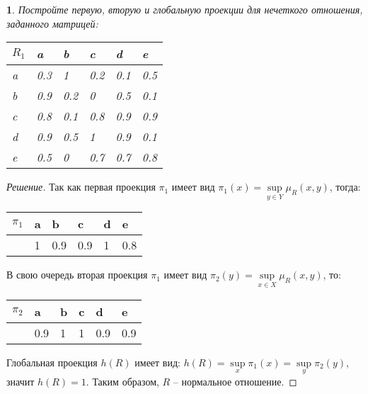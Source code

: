 \documentclass[11pt,a4paper,oneside]{article}
\newenvironment{problem}{
	\medskip
	\begin{problem-internal}
	}{
	\end{problem-internal}
}
\newenvironment{solution}{
	\begin{proof}[Решение]
		\vspace{-8px}
		\setlength{\parskip}{4px}
		\setlength{\parindent}{0px}
	}{
	\end{proof}
}
\newtheorem{problem-internal}{}
\begin{document}
	\newpage
	
	\begin{problem}
		Постройте первую, вторую и глобальную проекции для нечеткого отношения, заданного матрицей: 
		\begin{table}[!htbp]
			\begin{tabular}{|l|l|l|l|l|l|}
				\hline
				$R_1$ & a   & b   & c   & d   & e   \\ \hline
				a     & 0.3 & 1   & 0.2 & 0.1 & 0.5 \\ \hline
				b     & 0.9 & 0.2 & 0   & 0.5 & 0.1 \\ \hline
				c     & 0.8 & 0.1 & 0.8 & 0.9 & 0.9 \\ \hline
				d     & 0.9 & 0.5 & 1   & 0.9 & 0.1 \\ \hline
				e     & 0.5 & 0   & 0.7 & 0.7 & 0.8 \\ \hline
			\end{tabular}
		\end{table}
	\end{problem}	

	\begin{solution}
		Так как первая проекция $\pi_1$ имеет вид $\pi_1(x) = \sup\limits_{y \in Y} \mu_R(x,y)$, тогда:
		\begin{table}[!htbp]
			\begin{tabular}{|l|l|l|l|l|l|}
				\hline
				$\pi_1$ & a & b   & c   & d & e   \\ \hline
				& 1 & 0.9 & 0.9 & 1 & 0.8 \\ \hline
			\end{tabular}
		\end{table}
		\newline
		В свою очередь вторая проекция $\pi_1$ имеет вид $\pi_2(y) = \sup\limits_{x \in X} \mu_R(x,y) $, то:
		\begin{table}[!htbp]
			\begin{tabular}{|l|l|l|l|l|l|}
				\hline
				$\pi_2$ & a   & b & c & d   & e   \\ \hline
				& 0.9 & 1 & 1 & 0.9 & 0.9 \\ \hline
			\end{tabular}
		\end{table}
		\newline
		Глобальная проекция $h(R)$ имеет вид: $h(R) = \sup\limits_x \pi_1(x) = \sup\limits_y \pi_2(y) $, значит $h(R) = 1$. Таким образом, $R$ -- нормальное отношение.
	\end{solution}
		
	\newpage
	
\end{document}
